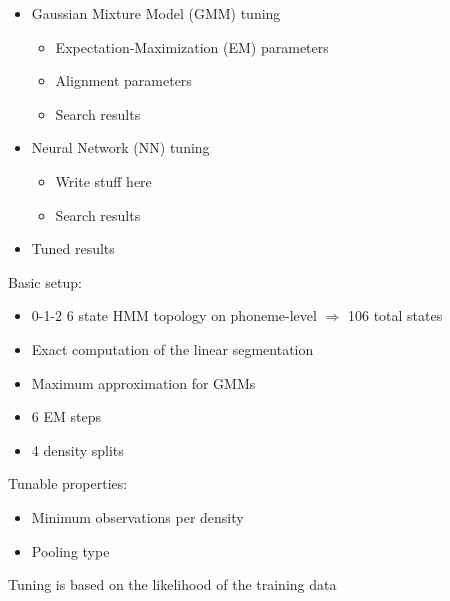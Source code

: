 \documentclass[11pt, a4paper, landscape]{article}
\begin{document}
\TitlePage

\NewPage{}
\vfill
\begin{itemize}
  \item Gaussian Mixture Model (GMM) tuning
  \begin{itemize}
    \item Expectation-Maximization (EM) parameters
    \item Alignment parameters
    \item Search results
  \end{itemize}
  \item Neural Network (NN) tuning
  \begin{itemize}
    \item Write stuff here
    \item Search results
  \end{itemize}
  \item Tuned results
\end{itemize}
\vfill

\NewPage{}
\vfill
Basic setup:
\begin{itemize}
  \item 0-1-2 6 state HMM topology on phoneme-level $\Rightarrow$ 106 total states
  \item Exact computation of the linear segmentation
  \item Maximum approximation for GMMs
  \item 6 EM steps
  \item 4 density splits
\end{itemize} 
\vspace{20pt}
Tunable properties:
\begin{itemize}
  \item Minimum observations per density
  \item Pooling type
\end{itemize}
\vspace{20pt}
Tuning is based on the likelihood of the training data
\vfill

 
\end{document}
